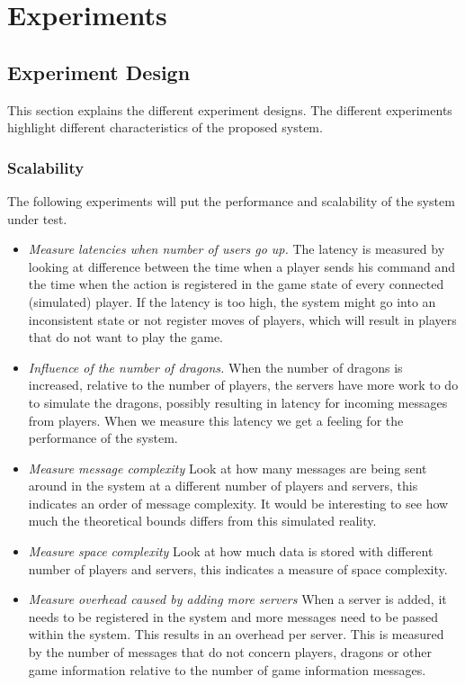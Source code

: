 \section{Experiments}
\label{chap:expresults}

\subsection{Experiment Design}
This section explains the different experiment designs. The different experiments highlight different characteristics of the proposed system.

\subsubsection{Scalability}
The following experiments will put the performance and scalability of the system under test.

\begin{itemize}
\item \emph{Measure latencies when number of users go up.} The latency is measured by looking at difference between the time when a player sends his command and the time when the action is registered in the game state of every connected (simulated) player. If the latency is too high, the system might go into an inconsistent state or not register moves of players, which will result in players that do not want to play the game. 
\item \emph{Influence of the number of dragons.} When the number of dragons is increased, relative to the number of players, the servers have more work to do to simulate the dragons, possibly resulting in latency for incoming messages from players. When we measure this latency we get a feeling for the performance of the system. 
\item \emph{Measure message complexity} Look at how many messages are being sent around in the system at a different number of players and servers, this indicates an order of message complexity. It would be interesting to see how much the theoretical bounds differs from this simulated reality.
\item \emph{Measure space complexity} Look at how much data is stored with different number of players and servers, this indicates a measure of space complexity. 
\item \emph{Measure overhead caused by adding more servers} When a server is added, it needs to be registered in the system and more messages need to be passed within the system. This results in an overhead per server. This is measured by the number of messages that do not concern players, dragons or other game information relative to the number of game information messages.
\end{itemize}

